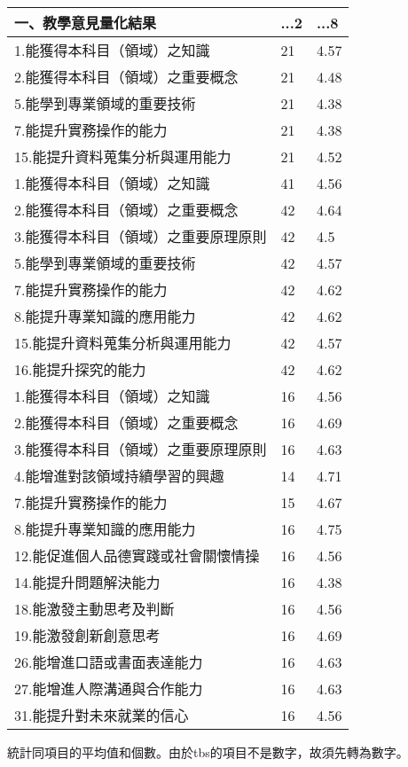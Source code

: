 \documentclass[
]{book}
\begin{document}
\begin{tabular}{l|l|l}
\hline
一、教學意見量化結果 & ...2 & ...8\\
\hline
1.能獲得本科目（領域）之知識 & 21 & 4.57\\
\hline
2.能獲得本科目（領域）之重要概念 & 21 & 4.48\\
\hline
5.能學到專業領域的重要技術 & 21 & 4.38\\
\hline
7.能提升實務操作的能力 & 21 & 4.38\\
\hline
15.能提升資料蒐集分析與運用能力 & 21 & 4.52\\
\hline
1.能獲得本科目（領域）之知識 & 41 & 4.56\\
\hline
2.能獲得本科目（領域）之重要概念 & 42 & 4.64\\
\hline
3.能獲得本科目（領域）之重要原理原則 & 42 & 4.5\\
\hline
5.能學到專業領域的重要技術 & 42 & 4.57\\
\hline
7.能提升實務操作的能力 & 42 & 4.62\\
\hline
8.能提升專業知識的應用能力 & 42 & 4.62\\
\hline
15.能提升資料蒐集分析與運用能力 & 42 & 4.57\\
\hline
16.能提升探究的能力 & 42 & 4.62\\
\hline
1.能獲得本科目（領域）之知識 & 16 & 4.56\\
\hline
2.能獲得本科目（領域）之重要概念 & 16 & 4.69\\
\hline
3.能獲得本科目（領域）之重要原理原則 & 16 & 4.63\\
\hline
4.能增進對該領域持續學習的興趣 & 14 & 4.71\\
\hline
7.能提升實務操作的能力 & 15 & 4.67\\
\hline
8.能提升專業知識的應用能力 & 16 & 4.75\\
\hline
12.能促進個人品德實踐或社會關懷情操 & 16 & 4.56\\
\hline
14.能提升問題解決能力 & 16 & 4.38\\
\hline
18.能激發主動思考及判斷 & 16 & 4.56\\
\hline
19.能激發創新創意思考 & 16 & 4.69\\
\hline
26.能增進口語或書面表達能力 & 16 & 4.63\\
\hline
27.能增進人際溝通與合作能力 & 16 & 4.63\\
\hline
31.能提升對未來就業的信心 & 16 & 4.56\\
\hline
\end{tabular}

統計同項目的平均值和個數。由於tbs的項目不是數字，故須先轉為數字。
\end{document}
